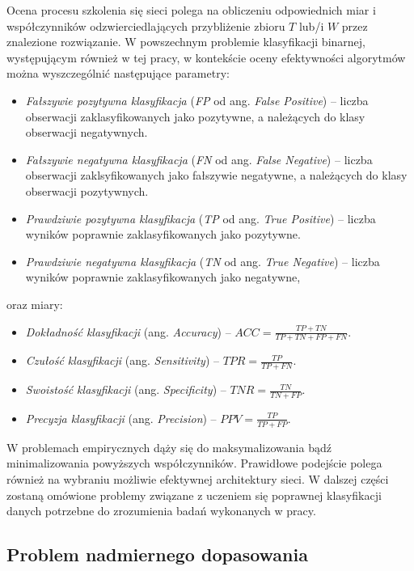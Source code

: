 Ocena procesu szkolenia się sieci polega na obliczeniu odpowiednich miar i współczynników odzwierciedlających przybliżenie zbioru $T$ lub/i $W$ przez znalezione rozwiązanie. W powszechnym problemie klasyfikacji binarnej, występującym również w tej pracy, w kontekście oceny efektywności algorytmów można wyszczególnić następujące parametry:
\begin{itemize}
	\item \textit{Fałszywie pozytywna klasyfikacja} (\textit{FP} od ang. \textit{False Positive}) -- liczba obserwacji zaklasyfikowanych jako pozytywne, a należących do klasy obserwacji negatywnych.
	\item \textit{Fałszywie negatywna klasyfikacja} (\textit{FN} od ang. \textit{False Negative}) -- liczba obserwacji zaklsyfikowanych jako fałszywie negatywne, a należących do klasy obserwacji pozytywnych. 
	\item \textit{Prawdziwie pozytywna klasyfikacja} (\textit{TP} od ang. \textit{True Positive}) -- liczba wyników poprawnie zaklasyfikowanych jako pozytywne. 
	\item \textit{Prawdziwie negatywna klasyfikacja} (\textit{TN} od ang. \textit{True Negative}) -- liczba wyników poprawnie zaklasyfikowanych jako negatywne,
\end{itemize}
oraz miary:
\begin{itemize}
	\item \textit{Dokładność klasyfikacji} (ang. \textit{Accuracy}) -- $ACC = \frac{TP + TN}{TP+TN+FP+FN}$.
	\item \textit{Czułość klasyfikacji} (ang. \textit{Sensitivity}) -- $TPR = \frac{TP}{TP + FN}$.
	\item \textit{Swoistość klasyfikacji} (ang. \textit{Specificity}) -- $TNR = \frac{TN}{TN + FP}$.
	\item \textit{Precyzja klasyfikacji} (ang. \textit{Precision}) -- $PPV = \frac{TP}{TP + FP}$.
\end{itemize}

W problemach empirycznych dąży się do maksymalizowania bądź minimalizowania powyższych współczynników. Prawidłowe podejście polega również na wybraniu możliwie efektywnej architektury sieci. W dalszej części zostaną omówione problemy związane z uczeniem się poprawnej klasyfikacji danych potrzebne do zrozumienia badań wykonanych w pracy.

\subsection{Problem nadmiernego dopasowania}
\label{sec-overffiting}

